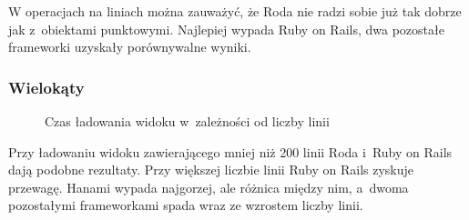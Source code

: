 \documentclass[archivemode]{mgr}
\begin{document}
W operacjach na liniach można zauważyć, że Roda nie radzi sobie już tak dobrze jak z~obiektami punktowymi. Najlepiej wypada Ruby on Rails, dwa pozostałe frameworki uzyskały porównywalne wyniki.

\subsubsection{Wielokąty}

\begin{figure}[H]
  \centering
  \caption{Czas ładowania widoku w~zależności od liczby linii}
  \label{fig:read_lines}
\end{figure}

Przy ładowaniu widoku zawierającego mniej niż 200 linii Roda i~Ruby on Rails dają podobne rezultaty. Przy większej liczbie linii Ruby on Rails zyskuje przewagę. Hanami wypada najgorzej, ale różnica między nim, a~dwoma pozostałymi frameworkami spada wraz ze wzrostem liczby linii.
\end{document}
